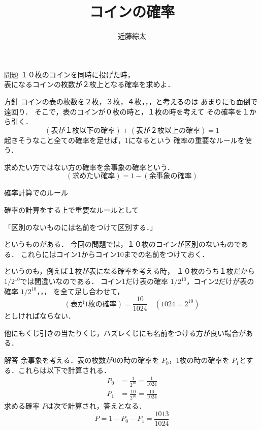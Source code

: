 \documentclass[dvipdfmx]{beamer}
\title{コインの確率}
\author{近藤綜太}
\begin{document}
\maketitle
\begin{frame}{問題}\centering
	１０枚のコインを同時に投げた時，\\表になるコインの枚数が２枚上となる確率を求めよ．
	
\end{frame}
\begin{frame}{方針}
	コインの表の枚数を２枚，３枚，４枚，，，と考えるのは
	あまりにも面倒で遠回り．
	そこで，表のコインが０枚の時と，１枚の時を考えて
	その確率を１から引く．
	\[(\text{表が１枚以下の確率})+(\text{表が２枚以上の確率})=1\]
	起きそうなこと全ての確率を足せば，1になるという
	確率の重要なルールを使う．

	求めたい方ではない方の確率を余事象の確率という．
	\[(\text{求めたい確率})=1 - (\text{余事象の確率})\]
\end{frame}

\begin{frame}{確率計算でのルール}

	確率の計算をする上で重要なルールとして
	\begin{center}
		「区別のないものには名前をつけて区別する．」
	\end{center}
	というものがある．
	今回の問題では，１０枚のコインが区別のないものである．
	これらにはコイン1からコイン10までの名前をつけておく．

	というのも，例えば１枚が表になる確率を考える時，
	１０枚のうち１枚だから $1/2^{10}$では間違いなのである．
	コイン1だけ表の確率 $1/2^{10}$，コイン2だけが表の確率 $1/2^{10}$，，，
	を全て足し合わせて，
	\[(\text{表が1枚の確率})= \frac{10}{1024} \quad (1024 = 2^{10})\]
	としければならない．

	他にもくじ引きの当たりくじ，ハズレくじにも名前をつける方が良い場合がある．

\end{frame}

\begin{frame}{解答}
	余事象を考える．表の枚数が0の時の確率を $P_0$，1枚の時の確率を
	$P_1$とする．これらは以下で計算される．
	\begin{align*}
		P_0 &= \frac{1}{2^{10}} = \frac{1}{1024}\\
		P_1 &= \frac{10}{2^{10}}= \frac{10}{1024}
	\end{align*}
	求める確率 $P$は次で計算され，答えとなる．
	\[P = 1 - P_0 - P_1 = \frac{1013}{1024}\]

\end{frame}
	
\end{document}
